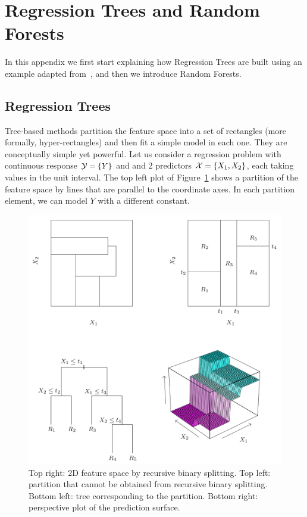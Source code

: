 \section{Regression Trees and Random Forests}
\label{A:RegTrees}

In this appendix we first start explaining how Regression Trees are built using an example adapted from~\cite{hastie2009elements}, and then we introduce Random Forests.

\subsection{Regression Trees}
Tree-based methods partition the feature space into a set of rectangles (more formally, hyper-rectangles) and then fit a simple model in each one. They are conceptually simple yet powerful.
Let us consider a regression problem with continuous response $\mathcal{Y} = \{Y\}$ and and 2 predictors $\mathcal{X} = \{X_1,X_2\}$, each taking values in the unit interval. The top left plot of Figure~\ref{fig:friedman} shows a partition of the feature space by lines that are parallel to the coordinate axes. In each partition element, we can model $Y$ with a different constant.
\begin{figure}
  \centering
  \includegraphics[width=0.7\columnwidth]{figures/friedman}
  \vspace{-8pt}
  \caption{Top right: 2D feature space by recursive binary splitting. Top left: partition that cannot be obtained from recursive binary splitting. Bottom left: tree corresponding to the partition. Bottom right:  perspective plot of the prediction surface.}
  \label{fig:friedman}
   \vspace{-10pt}
\end{figure} 
